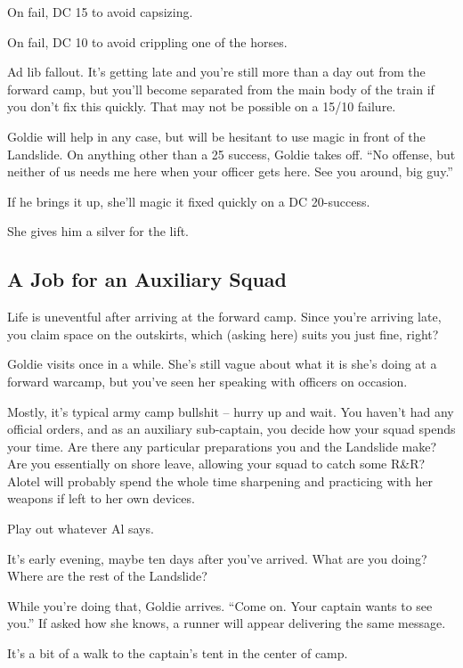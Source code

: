 \begin{multicols}{2}
On fail, DC 15 to avoid capsizing.

On fail, DC 10 to avoid crippling one of the horses.

Ad lib fallout.
It's getting late and you're still more than a day out from the forward camp, but you'll become
  separated from the main body of the train if you don't fix this quickly.
That may not be possible on a 15/10 failure.

Goldie will help in any case, but will be hesitant to use magic in front of the Landslide.
On anything other than a 25 success, Goldie takes off.
``No offense, but neither of us needs me here when your officer gets here.
See you around, big guy.''

If he brings it up, she'll magic it fixed quickly on a DC 20-success.

She gives him a silver for the lift.

\subsection{A Job for an Auxiliary Squad}

Life is uneventful after arriving at the forward camp.
Since you're arriving late, you claim space on the outskirts,
  which (asking here) suits you just fine, right?

Goldie visits once in a while.
She's still vague about what it is she's doing at a forward warcamp,
  but you've seen her speaking with officers on occasion.

Mostly, it's typical army camp bullshit -- hurry up and wait.
You haven't had any official orders, and as an auxiliary sub-captain, you decide how your squad
  spends your time.
Are there any particular preparations you and the Landslide make?
Are you essentially on shore leave, allowing your squad to catch some R\&R?
Alotel will probably spend the whole time sharpening and practicing with her weapons if left to
  her own devices.

Play out whatever Al says.

\hlinefill

It's early evening, maybe ten days after you've arrived.
What are you doing?
Where are the rest of the Landslide?

While you're doing that, Goldie arrives.
``Come on.
  Your captain wants to see you.''
If asked how she knows, a runner will appear delivering the same message.

It's a bit of a walk to the captain's tent in the center of camp.


\end{multicols}
